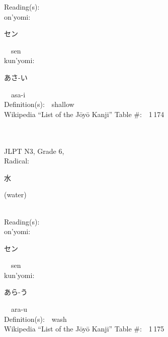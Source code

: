 \begin{multicols}{2}
Reading(s):\ \ \\
{\hspace*{1em}}on'yomi:\ \ \\
{\hspace*{2em}}{\begin{CJK}{UTF8}{min} セン \end{CJK}}\ \ sen\ \ \\
{\hspace*{1em}}kun'yomi:\ \ \\
{\hspace*{2em}}{\begin{CJK}{UTF8}{min} あさ-い \end{CJK}}\ \ asa-i\ \ \\
Definition(s):\ \ shallow \\
Wikipedia ``List of the J\=oy\=o Kanji'' Table \#:\ \ 1\,174 \\
\ \ \\
{\fontsize{34pt}{40pt}  }\ \ \\  %
{JLPT N3, Grade 6, \\Radical:\ \ {\begin{CJK}{UTF8}{min} 水 \end{CJK}} (water) } \\
Reading(s):\ \ \\
{\hspace*{1em}}on'yomi:\ \ \\
{\hspace*{2em}}{\begin{CJK}{UTF8}{min} セン \end{CJK}}\ \ sen\ \ \\
{\hspace*{1em}}kun'yomi:\ \ \\
{\hspace*{2em}}{\begin{CJK}{UTF8}{min} あら-う \end{CJK}}\ \ ara-u\ \ \\
Definition(s):\ \ wash \\
Wikipedia ``List of the J\=oy\=o Kanji'' Table \#:\ \ 1\,175 \\
\ \ \\
{\fontsize{34pt}{40pt}  }\ \ \\  %

\end{multicols}
